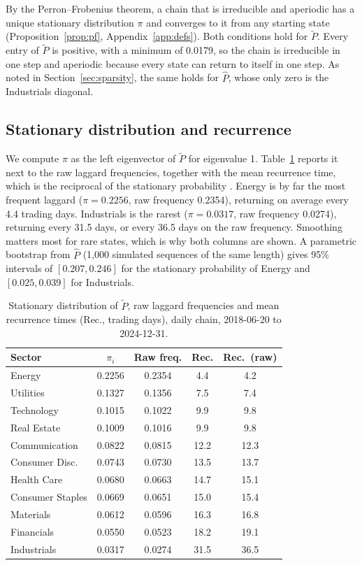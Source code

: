 \documentclass[11pt]{article}
\begin{document}
By the Perron--Frobenius theorem, a chain that is irreducible and aperiodic has a unique stationary distribution $\pi$ and converges to it from any starting state (Proposition~\ref{prop:pf}, Appendix~\ref{app:defs}). Both conditions hold for $\tilde P$. Every entry of $\tilde P$ is positive, with a minimum of 0.0179, so the chain is irreducible in one step and aperiodic because every state can return to itself in one step. As noted in Section~\ref{sec:sparsity}, the same holds for $\hat P$, whose only zero is the Industrials diagonal.

\subsection{Stationary distribution and recurrence}

We compute $\pi$ as the left eigenvector of $\tilde P$ for eigenvalue 1. Table~\ref{tab:pi} reports it next to the raw laggard frequencies, together with the mean recurrence time, which is the reciprocal of the stationary probability \cite{kemenysnell1976}. Energy is by far the most frequent laggard ($\pi = 0.2256$, raw frequency 0.2354), returning on average every 4.4 trading days. Industrials is the rarest ($\pi = 0.0317$, raw frequency 0.0274), returning every 31.5 days, or every 36.5 days on the raw frequency. Smoothing matters most for rare states, which is why both columns are shown. A parametric bootstrap from $\hat P$ (1{,}000 simulated sequences of the same length) gives 95\% intervals of $[0.207, 0.246]$ for the stationary probability of Energy and $[0.025, 0.039]$ for Industrials.

\begin{table}[htbp]\centering
\caption{Stationary distribution of $\tilde P$, raw laggard frequencies and mean recurrence times (Rec., trading days), daily chain, 2018-06-20 to 2024-12-31.}
\label{tab:pi}
\begin{tabular}{lcccc}
\toprule
Sector & $\pi_i$ & Raw freq. & Rec. & Rec.\ (raw) \\
\midrule
Energy & 0.2256 & 0.2354 & 4.4 & 4.2 \\
Utilities & 0.1327 & 0.1356 & 7.5 & 7.4 \\
Technology & 0.1015 & 0.1022 & 9.9 & 9.8 \\
Real Estate & 0.1009 & 0.1016 & 9.9 & 9.8 \\
Communication & 0.0822 & 0.0815 & 12.2 & 12.3 \\
Consumer Disc. & 0.0743 & 0.0730 & 13.5 & 13.7 \\
Health Care & 0.0680 & 0.0663 & 14.7 & 15.1 \\
Consumer Staples & 0.0669 & 0.0651 & 15.0 & 15.4 \\
Materials & 0.0612 & 0.0596 & 16.3 & 16.8 \\
Financials & 0.0550 & 0.0523 & 18.2 & 19.1 \\
Industrials & 0.0317 & 0.0274 & 31.5 & 36.5 \\
\bottomrule
\end{tabular}
\end{table}
\end{document}

